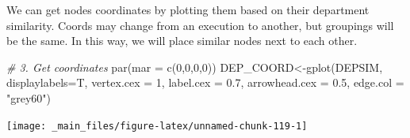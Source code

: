 \documentclass[
  notitlepage,
  onecolumn,
  openany]{book}
\newenvironment{Shaded}{\begin{snugshade}}{\end{snugshade}}
\newcommand{\AttributeTok}[1]{\textcolor[rgb]{0.77,0.63,0.00}{#1}}
\newcommand{\CommentTok}[1]{\textcolor[rgb]{0.56,0.35,0.01}{\textit{#1}}}
\newcommand{\ConstantTok}[1]{\textcolor[rgb]{0.00,0.00,0.00}{#1}}
\newcommand{\DecValTok}[1]{\textcolor[rgb]{0.00,0.00,0.81}{#1}}
\newcommand{\FloatTok}[1]{\textcolor[rgb]{0.00,0.00,0.81}{#1}}
\newcommand{\FunctionTok}[1]{\textcolor[rgb]{0.00,0.00,0.00}{#1}}
\newcommand{\NormalTok}[1]{#1}
\newcommand{\OtherTok}[1]{\textcolor[rgb]{0.56,0.35,0.01}{#1}}
\newcommand{\SpecialCharTok}[1]{\textcolor[rgb]{0.00,0.00,0.00}{#1}}
\newcommand{\StringTok}[1]{\textcolor[rgb]{0.31,0.60,0.02}{#1}}
\begin{document}
\begin{Shaded}
\end{Shaded}

We can get nodes coordinates by plotting them based on their department similarity. Coords may change from an execution to another, but groupings will be the same. In this way, we will place similar nodes next to each other.

\begin{Shaded}
\begin{Highlighting}[]
\CommentTok{\# 3. Get coordinates}
\FunctionTok{par}\NormalTok{(}\AttributeTok{mar =} \FunctionTok{c}\NormalTok{(}\DecValTok{0}\NormalTok{,}\DecValTok{0}\NormalTok{,}\DecValTok{0}\NormalTok{,}\DecValTok{0}\NormalTok{))}
\NormalTok{DEP\_COORD}\OtherTok{\textless{}{-}}\FunctionTok{gplot}\NormalTok{(DEPSIM, }
                 \AttributeTok{displaylabels=}\NormalTok{T,}
                 \AttributeTok{vertex.cex =} \DecValTok{1}\NormalTok{,}
                 \AttributeTok{label.cex =} \FloatTok{0.7}\NormalTok{,}
                 \AttributeTok{arrowhead.cex =} \FloatTok{0.5}\NormalTok{,}
                 \AttributeTok{edge.col =} \StringTok{"grey60"}\NormalTok{)}
\end{Highlighting}
\end{Shaded}

\begin{center}\texttt{[image: \_main\_files/figure-latex/unnamed-chunk-119-1]} \end{center}
\end{document}
